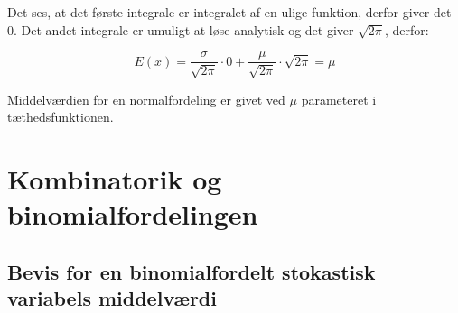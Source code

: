 \documentclass{article}
\makeatletter
\newenvironment{proofw}{\par
  \pushQED{\qed}%
  \normalfont \topsep6\p@\@plus6\p@\relax
  \trivlist
  \item[]\ignorespaces
}{%
  \popQED\endtrivlist\@endpefalse
}
\makeatother
\begin{document}
\begin{proofw}
Det ses, at det første integrale er integralet af en ulige funktion,
derfor giver det 0. Det andet integrale er umuligt at
løse analytisk og det giver $\sqrt{2\pi}$, derfor:

$$
E(x)=\frac{\sigma}{\sqrt{2\pi}} \cdot
0
    +
\frac{\mu}{\sqrt{2\pi}} \cdot
\sqrt{2\pi}=\mu
$$

Middelværdien for en normalfordeling er givet ved $\mu$ parameteret
i tæthedsfunktionen.

\end{proofw}

\section{Kombinatorik og binomialfordelingen}

\subsection{Bevis for en binomialfordelt stokastisk variabels middelværdi}
\end{document}
